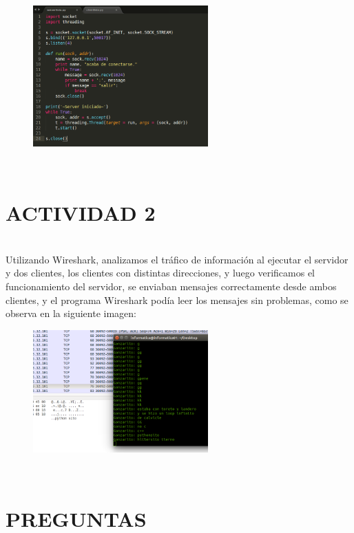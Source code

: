 \documentclass[onecolumn,12pt]{IEEEtran}
\begin{document}
\begin{figure}[!h]
\centering
\includegraphics[width=0.6\textwidth]{servidorsito.png}
\label{fig:mesh1}
\end{figure}

\hfill \\
\section{ACTIVIDAD 2}
\hfill \\

Utilizando Wireshark, analizamos el tráfico de información al ejecutar el servidor y dos clientes, los clientes con distintas direcciones, y luego verificamos el funcionamiento del servidor, se enviaban mensajes correctamente desde ambos clientes, y el programa Wireshark podía leer los mensajes sin problemas, como se observa en la siguiente imagen:

\begin{figure}[!h]
\centering
\includegraphics[width=0.6\textwidth]{wiresharkisito.png}
\label{fig:mesh1}
\end{figure}

\newpage
\hfill \\
\section{PREGUNTAS}
\hfill \\
\end{document}
